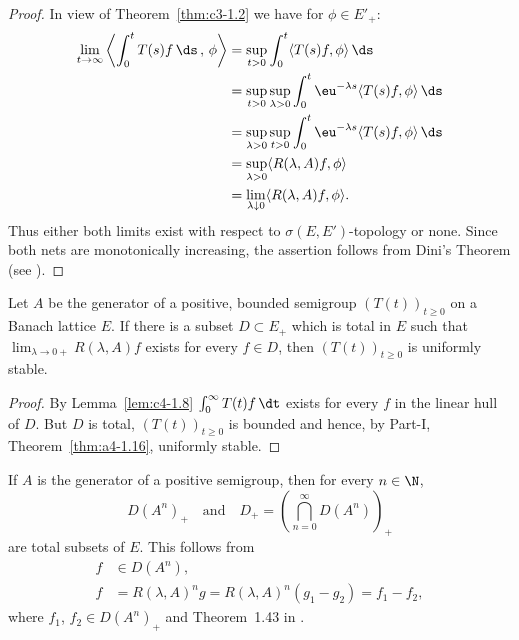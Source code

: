 \begin{proof}
In view of Theorem~\ref{thm:c3-1.2}  we have for $\phi \in E'_{+}$:
\begin{align*}
\lim_{t \to \infty}  \left\langle\int_{0}^{t} T(s)f \, \ds \,,\,\phi\right\rangle &= \sup_{t>0} \int_{0}^{t}\langle T(s)f,\phi\rangle \, \ds \\
&= \sup_{t>0}\sup_{\lambda>0} \int_{0}^{t}\eu^{-\lambda s}\langle T(s)f,\phi\rangle \, \ds \\
&= \sup_{\lambda>0}\sup_{t>0} \int_{0}^{t}\eu^{-\lambda s}\langle T(s)f,\phi\rangle \, \ds \\
&= \sup_{\lambda>0} \langle R(\lambda,A)f,\phi\rangle \\
&= \lim_{\lambda \downarrow 0} \langle R(\lambda,A)f,\phi\rangle.
\end{align*}
Thus either both limits exist with respect to $\sigma(E,E')$-topology or none.
Since both nets are monotonically increasing, the assertion follows from Dini's Theorem (see \textcite[II. Theorem~5.9]{schaefer:1974}).
\end{proof}
\begin{proposition}\label{prop:c4-1.9}
%
Let $A$ be the generator of a positive, bounded semigroup $(T(t))_{t \geq 0}$ on a Banach lattice $E$.
If there is a subset $D \subset E_{+}$ which is total in $E$ such that $\lim_{\lambda \to 0+} R(\lambda,A)f$ exists for every $f \in D$, then $(T(t))_{t \geq 0}$ is uniformly stable.
\end{proposition}
\begin{proof}
By Lemma~\ref{lem:c4-1.8} $\int_{0}^{\infty} T(t)f \, \dt$ exists for every $f$ in the linear hull of\/ $D$.
But $D$ is total, $(T(t))_{t \geq 0}$ is bounded and hence, by Part-I, Theorem~\ref{thm:a4-1.16}, uniformly stable.
\end{proof}
\begin{remark}\label{rem:c4-1.10}
If\/ $A$ is the generator of a positive semigroup, then for every $n \in \N$, 
\[
D(A^{n})_{+}
\quad \text{and} \quad 
D_{+} =  \left(\bigcap_{n=0}^{\infty} D(A^{n})\right)_{+}
\]
are total subsets of\/ $E$.
This follows from 
\begin{align*}
    f &\in D(A^{n}), \\
    f &= R(\lambda,A)^{n}g = R(\lambda,A)^{n}(g_{1} - g_{2}) = f_{1} - f_{2},
\end{align*}
where $f_{1}$, $f_{2} \in D(A^{n})_{+}$ and Theorem~1.43 in \textcite{davies:1980}.
\end{remark}
